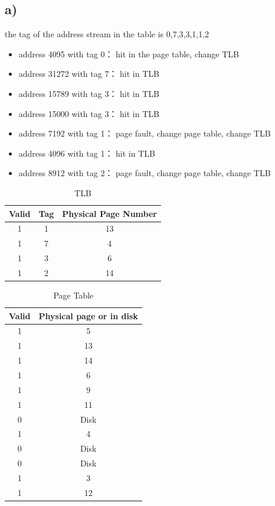 \documentclass[cn,12pt]{homework}
\begin{document}
\begin{solution}

\subsection*{a)}

the tag of the address stream in the table is 0,7,3,3,1,1,2

\begin{itemize}
  \item address 4095 with tag 0： hit in the page table, change TLB 
  \item address 31272 with tag 7： hit in TLB
  \item address 15789 with tag 3： hit in TLB
  \item address 15000 with tag 3： hit in TLB
  \item address 7192 with tag 1： page fault, change page table, change TLB
  \item address 4096 with tag 1： hit in TLB
  \item address 8912 with tag 2： page fault, change page table, change TLB
\end{itemize}

\begin{table}[H]
\centering
\caption{TLB}
\begin{tabular}{|c|c|c|}
\hline
Valid & Tag & Physical Page Number \\ \hline
1 & 1 & 13 \\ \hline
1 & 7 & 4 \\ \hline
1 & 3 & 6 \\ \hline
1 & 2 & 14 \\ \hline
\end{tabular}
\end{table}

\begin{table}[H]
\centering
\caption{Page Table}
\begin{tabular}{|c|c|}
\hline
Valid & Physical page or in disk \\ \hline
1 & 5 \\ \hline
1 & 13 \\ \hline
1 & 14 \\ \hline
1 & 6 \\ \hline
1 & 9 \\ \hline
1 & 11 \\ \hline
0 & Disk \\ \hline
1 & 4 \\ \hline
0 & Disk \\ \hline
0 & Disk \\ \hline
1 & 3 \\ \hline
1 & 12 \\ \hline
\end{tabular}
\end{table}


\end{solution}
\end{document}
